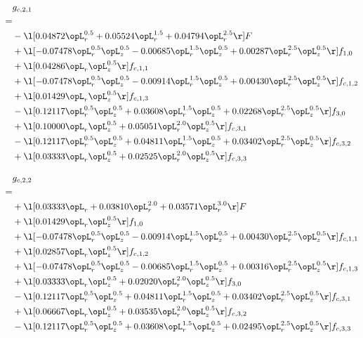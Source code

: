 \begin{alignat}{2} 
\label{eq:g_21_0} 
& g_{c,2,1} \nonumber \\ 
 = \\ 
& - \l[  0.04872 \opL_r^{0.5} +  0.05524 \opL_r^{1.5} +  0.04794 \opL_r^{2.5}  \r] F \nonumber \\ 
& + \l[  -0.07478 \opL_r^{0.5} \opL_z^{0.5}   -0.00685 \opL_r^{1.5} \opL_z^{0.5} +  0.00287 \opL_r^{2.5} \opL_z^{0.5}  \r] f_{1,0} \nonumber \\ 
& + \l[  0.04286 \opL_r \opL_z^{0.5}  \r] f_{c,1,1} \nonumber \\ 
& + \l[  -0.07478 \opL_r^{0.5} \opL_z^{0.5}   -0.00914 \opL_r^{1.5} \opL_z^{0.5} +  0.00430 \opL_r^{2.5} \opL_z^{0.5}  \r] f_{c,1,2} \nonumber \\ 
& + \l[  0.01429 \opL_r \opL_z^{0.5}  \r] f_{c,1,3} \nonumber \\ 
& - \l[  0.12117 \opL_r^{0.5} \opL_z^{0.5} +  0.03608 \opL_r^{1.5} \opL_z^{0.5} +  0.02268 \opL_r^{2.5} \opL_z^{0.5}  \r] f_{3,0} \nonumber \\ 
& + \l[  0.10000 \opL_r \opL_z^{0.5} +  0.05051 \opL_r^{2.0} \opL_z^{0.5}  \r] f_{c,3,1} \nonumber \\ 
& - \l[  0.12117 \opL_r^{0.5} \opL_z^{0.5} +  0.04811 \opL_r^{1.5} \opL_z^{0.5} +  0.03402 \opL_r^{2.5} \opL_z^{0.5}  \r] f_{c,3,2} \nonumber \\ 
& + \l[  0.03333 \opL_r \opL_z^{0.5} +  0.02525 \opL_r^{2.0} \opL_z^{0.5}  \r] f_{c,3,3} \nonumber \\ 
\end{alignat} 


\begin{alignat}{2} 
\label{eq:g_22_0} 
& g_{c,2,2} \nonumber \\ 
 = \\ 
& + \l[  0.03333 \opL_r +  0.03810 \opL_r^{2.0} +  0.03571 \opL_r^{3.0}  \r] F \nonumber \\ 
& + \l[  0.01429 \opL_r \opL_z^{0.5}  \r] f_{1,0} \nonumber \\ 
& + \l[  -0.07478 \opL_r^{0.5} \opL_z^{0.5}   -0.00914 \opL_r^{1.5} \opL_z^{0.5} +  0.00430 \opL_r^{2.5} \opL_z^{0.5}  \r] f_{c,1,1} \nonumber \\ 
& + \l[  0.02857 \opL_r \opL_z^{0.5}  \r] f_{c,1,2} \nonumber \\ 
& + \l[  -0.07478 \opL_r^{0.5} \opL_z^{0.5}   -0.00685 \opL_r^{1.5} \opL_z^{0.5} +  0.00316 \opL_r^{2.5} \opL_z^{0.5}  \r] f_{c,1,3} \nonumber \\ 
& + \l[  0.03333 \opL_r \opL_z^{0.5} +  0.02020 \opL_r^{2.0} \opL_z^{0.5}  \r] f_{3,0} \nonumber \\ 
& - \l[  0.12117 \opL_r^{0.5} \opL_z^{0.5} +  0.04811 \opL_r^{1.5} \opL_z^{0.5} +  0.03402 \opL_r^{2.5} \opL_z^{0.5}  \r] f_{c,3,1} \nonumber \\ 
& + \l[  0.06667 \opL_r \opL_z^{0.5} +  0.03535 \opL_r^{2.0} \opL_z^{0.5}  \r] f_{c,3,2} \nonumber \\ 
& - \l[  0.12117 \opL_r^{0.5} \opL_z^{0.5} +  0.03608 \opL_r^{1.5} \opL_z^{0.5} +  0.02495 \opL_r^{2.5} \opL_z^{0.5}  \r] f_{c,3,3} \nonumber \\ 
\end{alignat} 


